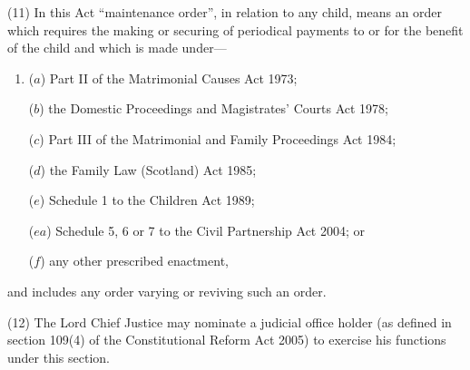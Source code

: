 \documentclass[12pt,a4paper]{article}
\begin{document}
(11) In this Act “maintenance order”, in relation to any child, means an order which requires the making or securing of periodical payments to or for the benefit of the child and which is made under—
\begin{enumerate}\item[]
($a$) Part II of the Matrimonial Causes Act 1973;

($b$) the Domestic Proceedings and Magistrates' Courts Act 1978;

($c$) Part III of the Matrimonial and Family Proceedings Act 1984;

($d$) the Family Law (Scotland) Act 1985;

($e$) Schedule 1 to the Children Act 1989; 

($ea$) Schedule 5, 6 or 7 to the Civil Partnership Act 2004; or

($f$) any other prescribed enactment,
\end{enumerate}
and includes any order varying or reviving such an order.

(12) The Lord Chief Justice may nominate a judicial office holder (as defined in section 109(4) of the Constitutional Reform Act 2005) to exercise his functions under this section.
\end{document}
